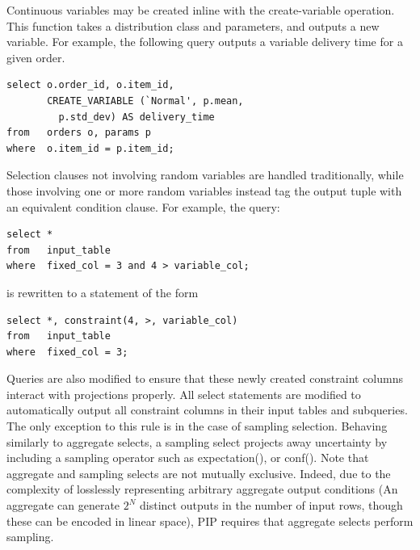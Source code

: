 Continuous variables may be created inline with the create-variable operation.  This function takes a distribution class and parameters, and outputs a new variable.  For example, the following query outputs a variable delivery time for a given order.

\begin{verbatim}
select o.order_id, o.item_id,
       CREATE_VARIABLE (`Normal', p.mean,
         p.std_dev) AS delivery_time
from   orders o, params p
where  o.item_id = p.item_id;
\end{verbatim}






Selection clauses not involving random variables are handled traditionally, while those involving one or more random variables instead tag the output tuple with an equivalent condition clause.  For example, the query:

\begin{verbatim}
select *
from   input_table
where  fixed_col = 3 and 4 > variable_col;
\end{verbatim}
%
is rewritten to a statement of the form
%
\begin{verbatim}
select *, constraint(4, >, variable_col)
from   input_table
where  fixed_col = 3;
\end{verbatim}

Queries are also modified to ensure that these newly created constraint columns interact with projections properly.  All select statements are modified to automatically output all constraint columns in their input tables and subqueries.  The only exception to this rule is in the case of sampling selection.  Behaving similarly to aggregate selects, a sampling select projects away uncertainty by including a sampling operator such as expectation(), or conf().  Note that aggregate and sampling selects are not mutually exclusive.  Indeed, due to the complexity of losslessly representing arbitrary aggregate output conditions (An aggregate can generate $2^{N}$ distinct outputs in the number of input rows, though these can be encoded in linear space), PIP requires that aggregate selects perform sampling. 

